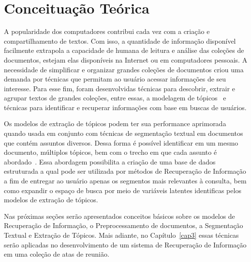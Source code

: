 \chapter{Conceituação Teórica}\label{cap2}


A popularidade dos computadores contribui cada vez com a criação e compartilhamento de textos. Com isso, a quantidade de informação disponível facilmente extrapola a capacidade de humana de leitura e análise das coleções de documentos, estejam elas disponíveis na Internet ou em computadores pessoais. A necessidade de simplificar e organizar grandes coleções de documentos criou uma demanda por técnicas que permitam ao usuário acessar informações de seu interesse. Para esse fim, foram desenvolvidas técnicas para descobrir, extrair e agrupar textos de grandes coleções, entre essas, a modelagem de tópicos~\cite{Hofmann1999,Deerwester1990,Lee1999,Blei2012} e técnicas para identificar e recuperar informações com base em buscas de usuários.  



Os modelos de extração de tópicos podem ter sua performance aprimorada quando usada em conjunto com técnicas de segmentação textual em documentos que contém assuntos diversos. Dessa forma é possível identificar em um mesmo documento, múltiplos tópicos, bem com o trecho em que cada assunto é abordado~\cite{Tagarelli2013, Cuong2011}. Essa abordagem possibilita a criação de uma base de dados estruturada a qual pode ser utilizada por métodos de Recuperação de Informação a fim de entregar ao usuário apenas os segmentos mais relevantes à consulta, bem como expandir o espaço de busca por meio de variáveis latentes identificas pelos modelos de extração de tópicos.




Nas próximas seções serão apresentados conceitos básicos sobre os modelos de Recuperação de Informação, o Preprocessamento de documentos, a Segmentação Textual e Extração de Tópicos. Mais adiante, no Capítulo~\ref{cap3} essas técnicas serão aplicadas no desenvolvimento de um sistema de Recuperação de Informação em uma coleção de atas de reunião.




